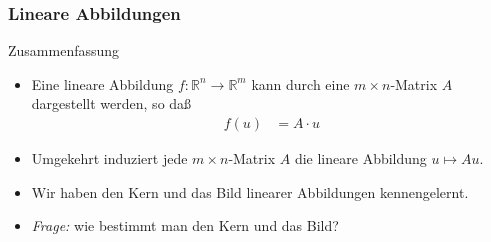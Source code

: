 \documentclass{beamer}
\renewcommand{\emph}[1]{{\textcolor{solarizedRed}{\itshape #1}}}
\newcommand\RR{\mathbb R}
\newcommand{\mytitle}{Lineare Abbildungen}
\begin{document}
\begin{frame}\frametitle{\mytitle}
	\begin{block}{Zusammenfassung}
		\begin{itemize}
			\item Eine lineare Abbildung $f:\RR^n\to\RR^m$ kann durch eine $m\times n$-Matrix $A$ dargestellt werden, so da\ss\
				\begin{align*}
					f(u)&=A\cdot u
				\end{align*}
			\item Umgekehrt induziert jede $m\times n$-Matrix $A$ die lineare Abbildung $u\mapsto Au$.
			\item Wir haben den Kern und das Bild linearer Abbildungen kennengelernt.
			\item \emph{Frage:} wie bestimmt man den Kern und das Bild?
		\end{itemize}
	\end{block}
\end{frame}
\end{document}
